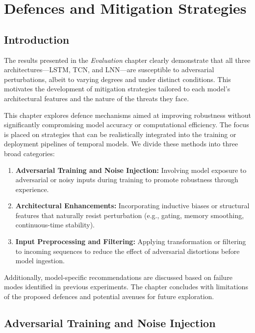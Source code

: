 \chapter{Defences and Mitigation Strategies}

\section{Introduction}

The results presented in the \textit{Evaluation} chapter clearly demonstrate that all three architectures—LSTM, TCN, and LNN—are susceptible to adversarial perturbations, albeit to varying degrees and under distinct conditions. This motivates the development of mitigation strategies tailored to each model’s architectural features and the nature of the threats they face.

This chapter explores defence mechanisms aimed at improving robustness without significantly compromising model accuracy or computational efficiency. The focus is placed on strategies that can be realistically integrated into the training or deployment pipelines of temporal models. We divide these methods into three broad categories:

\begin{enumerate}
    \item \textbf{Adversarial Training and Noise Injection:} Involving model exposure to adversarial or noisy inputs during training to promote robustness through experience.
    
    \item \textbf{Architectural Enhancements:} Incorporating inductive biases or structural features that naturally resist perturbation (e.g., gating, memory smoothing, continuous-time stability).
    
    \item \textbf{Input Preprocessing and Filtering:} Applying transformation or filtering to incoming sequences to reduce the effect of adversarial distortions before model ingestion.
\end{enumerate}

Additionally, model-specific recommendations are discussed based on failure modes identified in previous experiments. The chapter concludes with limitations of the proposed defences and potential avenues for future exploration.

\section{Adversarial Training and Noise Injection}

